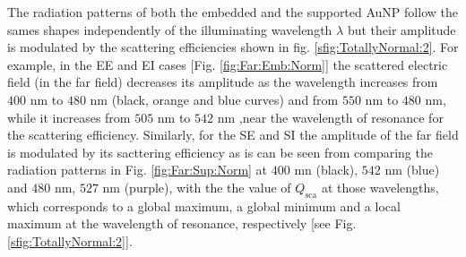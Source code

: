 The radiation patterns of both the embedded  and the supported AuNP follow the sames shapes independently of the illuminating wavelength $\lambda$ but their amplitude is modulated by the scattering efficiencies shown in fig. \ref{sfig:TotallyNormal:2}. For example, in the EE  and EI cases [Fig. \ref{fig:Far:Emb:Norm}] the scattered electric field (in the far field) decreases its amplitude as the wavelength increases from $400$ nm to $480$ nm (black, orange and blue curves) and from   $550$ nm to $480$  nm, while it increases from $505$ nm to $542$ nm ,near the wavelength of resonance for the scattering efficiency. Similarly, for the SE and SI  the amplitude of the far field is modulated by its sacttering efficiency as is can be seen from comparing the radiation patterns in Fig. \ref{fig:Far:Sup:Norm} at $400$ mn (black), $542$ nm (blue) and $480$ nm, $527$ nm (purple), with the the value of $Q_\text{sca}$ at those wavelengths, which corresponds to a global maximum, a global minimum and a local maximum at the wavelength of resonance, respectively [see Fig. \ref{sfig:TotallyNormal:2}].

